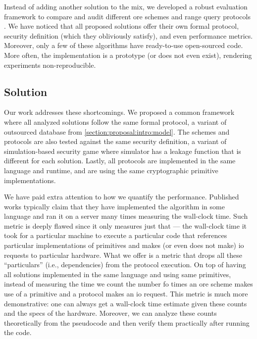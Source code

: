 			Instead of adding another solution to the mix, we developed a robust evaluation framework to compare and audit different \acrshort{ore} schemes and range query protocols \cite{ore-benchmark-17}.
			We have noticed that all proposed solutions offer their own formal protocol, security definition (which they obliviously satisfy), and even performance metrics.
			Moreover, only a few of these algorithms have ready-to-use open-sourced code.
			More often, the implementation is a prototype (or does not even exist), rendering experiments non-reproducible.

		\subsection{Solution}

			Our work addresses these shortcomings.
			We proposed a common framework where all analyzed solutions follow the same formal protocol, a variant of outsourced database from \cref{section:proposal:intro:model}.
			The schemes and protocols are also tested against the same security definition, a variant of simulation-based security game where simulator has a leakage function that is different for each solution.
			Lastly, all protocols are implemented in the same language and runtime, and are using the same cryptographic primitive implementations.

			We have paid extra attention to how we quantify the performance.
			Published works typically claim that they have implemented the algorithm in some language and ran it on a server many times measuring the wall-clock time.
			Such metric is deeply flawed since it only measures just that --- the wall-clock time it took for a particular machine to execute a particular code that references particular implementations of primitives and makes (or even does not make) \acrshort{io} requests to particular hardware.
			What we offer is a metric that drops all these ``particulars'' (i.e., dependencies) from the protocol execution.
			On top of having all solutions implemented in the same language and using same primitives, instead of measuring the time we count the number fo times an \acrshort{ore} scheme makes use of a primitive and a protocol makes an \acrshort{io} request.
			This metric is much more demonstrative: one can always get a wall-clock time estimate given these counts and the specs of the hardware.
			Moreover, we can analyze these counts theoretically from the pseudocode and then verify them practically after running the code.

